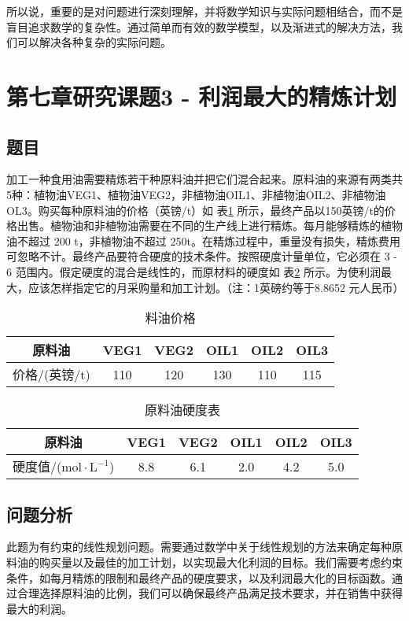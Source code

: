 \documentclass[a4,10pt,zihao=-4]{ctexart}
\begin{document}
所以说，重要的是对问题进行深刻理解，并将数学知识与实际问题相结合，而不是盲目追求数学的复杂性。通过简单而有效的数学模型，以及渐进式的解决方法，我们可以解决各种复杂的实际问题。




\newpage
\section{第七章研究课题3 - 利润最大的精炼计划}
\subsection{题目}
加工一种食用油需要精炼若干种原料油并把它们混合起来。原料油的来源有两类共5种：植物油VEG1、植物油VEG2，非植物油OIL1、非植物油OIL2、非植物油OL3。购买每种原料油的价格（英镑/t）如 表\ref{料油价格} 所示，最终产品以150英镑/t的价格出售。植物油和非植物油需要在不同的生产线上进行精炼。每月能够精炼的植物油不超过 200 t，非植物油不超过 250t。在精炼过程中，重量没有损失，精炼费用可忽略不计。最终产品要符合硬度的技术条件。按照硬度计量单位，它必须在 3 - 6 范围内。假定硬度的混合是线性的，而原材料的硬度如 表\ref{原料油硬度表} 所示。为使利润最大，应该怎样指定它的月采购量和加工计划。（注：1英磅约等于8.8652 元人民币）

\begin{table}[!ht]
    \centering
    \caption{料油价格}
    \begin{tabular}{|c|c|c|c|c|c|}
    \hline
        原料油 & VEG1 & VEG2 & OIL1 & OIL2 & OIL3 \\ \hline
        价格/(英镑/t) & 110 & 120 & 130 & 110 & 115 \\ \hline
    \end{tabular}
    \label{料油价格}
\end{table}

\begin{table}[!ht]
    \centering
    \caption{原料油硬度表}
    \begin{tabular}{|c|c|c|c|c|c|}
    \hline
        原料油 & VEG1 & VEG2 & OIL1 & OIL2 & OIL3 \\ \hline
        硬度值/($\text{mol} \cdot \text{L}^{-1}$) & 8.8 & 6.1 & 2.0 & 4.2 & 5.0 \\ \hline
    \end{tabular}
    \label{原料油硬度表}
\end{table}

\subsection{问题分析}
此题为有约束的线性规划问题。需要通过数学中关于线性规划的方法来确定每种原料油的购买量以及最佳的加工计划，以实现最大化利润的目标。我们需要考虑约束条件，如每月精炼的限制和最终产品的硬度要求，以及利润最大化的目标函数。通过合理选择原料油的比例，我们可以确保最终产品满足技术要求，并在销售中获得最大的利润。
\end{document}
